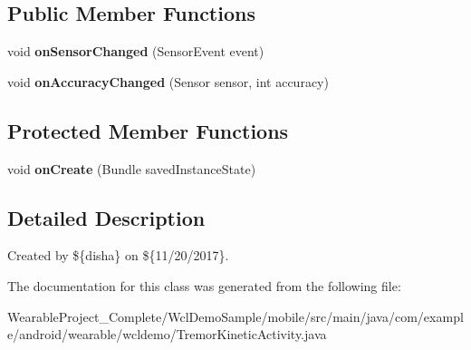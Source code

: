 \subsection*{Public Member Functions}
\begin{DoxyCompactItemize}
\item 
void {\bfseries on\+Sensor\+Changed} (Sensor\+Event event)\hypertarget{classcom_1_1example_1_1android_1_1wearable_1_1wcldemo_1_1TremorKineticActivity_a69319643549ff4dccbfdd539e629a10f}{}\label{classcom_1_1example_1_1android_1_1wearable_1_1wcldemo_1_1TremorKineticActivity_a69319643549ff4dccbfdd539e629a10f}

\item 
void {\bfseries on\+Accuracy\+Changed} (Sensor sensor, int accuracy)\hypertarget{classcom_1_1example_1_1android_1_1wearable_1_1wcldemo_1_1TremorKineticActivity_aaec5829c3d76d1a0921721cabff36cdd}{}\label{classcom_1_1example_1_1android_1_1wearable_1_1wcldemo_1_1TremorKineticActivity_aaec5829c3d76d1a0921721cabff36cdd}

\end{DoxyCompactItemize}
\subsection*{Protected Member Functions}
\begin{DoxyCompactItemize}
\item 
void {\bfseries on\+Create} (Bundle saved\+Instance\+State)\hypertarget{classcom_1_1example_1_1android_1_1wearable_1_1wcldemo_1_1TremorKineticActivity_a2c61585006d34bdad4a252c74a5aee63}{}\label{classcom_1_1example_1_1android_1_1wearable_1_1wcldemo_1_1TremorKineticActivity_a2c61585006d34bdad4a252c74a5aee63}

\end{DoxyCompactItemize}


\subsection{Detailed Description}
Created by \$\{disha\} on \$\{11/20/2017\}. 

The documentation for this class was generated from the following file\+:\begin{DoxyCompactItemize}
\item 
Wearable\+Project\+\_\+\+Complete/\+Wcl\+Demo\+Sample/mobile/src/main/java/com/example/android/wearable/wcldemo/Tremor\+Kinetic\+Activity.\+java\end{DoxyCompactItemize}
